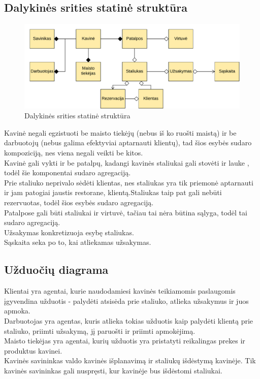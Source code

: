\documentclass{VUMIFPSkursinis}
\begin{document}
\begin{landscape}
\subsection{Dalykinės srities statinė struktūra}

	\begin {figure}[H]
	\centering
		\caption{Dalykinės srities statinė struktūra}
		\includegraphics[scale=1]{img/3lab/Diagrama1}
		
		\label{fig:ER}
	\end{figure}
\end{landscape}

Kavinė negali egzistuoti be maisto tiekėjų (nebus iš ko ruošti maistą) ir be darbuotojų (nebus galima efektyviai aptarnauti klientų), tad šios esybės sudaro kompoziciją, nes viena negali veikti be kitos.\\
Kavinė gali vykti ir be patalpų, kadangi kavinės staliukai gali stovėti ir 
lauke , todėl šie komponentai sudaro agregaciją.\\
Prie  staliuko  neprivalo  sėdėti  klientas,  nes
staliukas  yra  tik  priemonė  aptarnauti ir jam patogiai jaustis restorane,
klientą.Staliukas taip pat gali nebūti rezervuotas, todėl šios esybės sudaro agregaciją.\\
Patalpose gali būti staliukai ir virtuvė, tačiau tai nėra būtina sąlyga, todėl tai sudaro 
agregaciją.\\
Užsakymas konkretizuoja esybę staliukas.\\
Sąskaita seka po to, kai atliekamas užsakymas.\\

\subsection{Užduočių diagrama}
Klientai  yra  agentai,  kurie  naudodamiesi  kavinės  teikiamomis 
paslaugomis  įgyvendina  užduotis - palydėti  atsisėda  prie  staliuko,  atlieka  užsakymus  ir  juos apmoka. \\
Darbuotojas yra agentas, kuris atlieka tokias užduotis kaip palydėti klientą prie staliuko, 
priimti užsakymą, jį paruošti ir priimti apmokėjimą.\\
Maisto tiekėjas yra agentai, kurių užduotis yra pristatyti reikalingas prekes ir produktus kavinei.\\
Kavinės savininkas valdo kavinės išplanavimą ir staliukų išdėstymą kavinėje. Tik kavinės savininkas gali nuspręsti, kur kavinėje bus išdėstomi staliukai.\\
\end{document}
